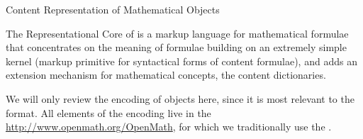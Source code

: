 \begin{omgroup}[id=mobj,short=Mathematical Objects]
\begin{omgroup}[id=mobj.core]{Content Representation of Mathematical Objects}
\begin{module}[id=OpenMath]
\begin{omgroup}[id=openmath]{The Representational Core of \openmath}
\openmath is a markup language for mathematical formulae that concentrates on the
meaning of formulae building on an extremely simple kernel (markup primitive for
syntactical forms of content formulae), and adds an extension mechanism for mathematical
concepts, the content dictionaries.


We will only review the \xml encoding of {\openmath} objects here, since it is most
relevant to the \omdoc format. All elements of the {\xml} encoding live in the
 \url{http://www.openmath.org/OpenMath}, for which
we traditionally use the 
.


\end{omgroup}
\end{module}
\end{omgroup}
\end{omgroup}

